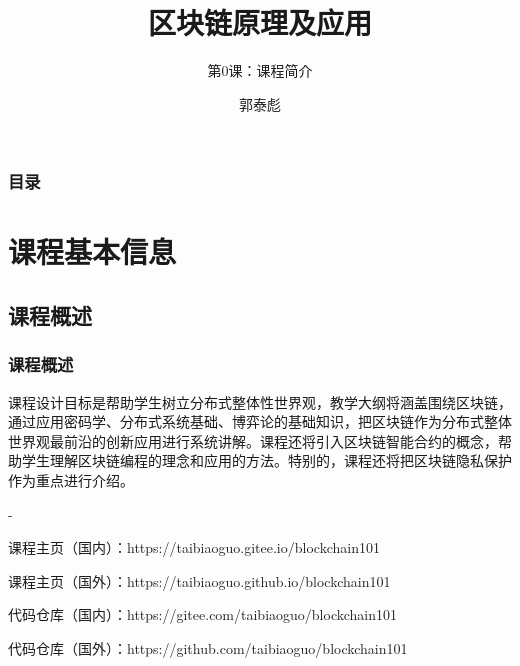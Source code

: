 \documentclass[11pt]{beamer}
\begin{document}
	\author{郭泰彪}
	\title{区块链原理及应用}
	\subtitle{第0课：课程简介}

	\begin{frame}[plain]
		\maketitle
	\end{frame}
	
	\begin{frame}
		\frametitle{目录}
		\tableofcontents[sectionstyle=show,subsectionstyle=show/shaded]
	\end{frame}

	\section{课程基本信息}
	\subsection{课程概述}
	\begin{frame}
		\frametitle{课程概述}
	课程设计目标是帮助学生树立分布式整体性世界观，教学大纲将涵盖围绕区块链，通过应用密码学、分布式系统基础、博弈论的基础知识，把区块链作为分布式整体世界观最前沿的创新应用进行系统讲解。课程还将引入区块链智能合约的概念，帮助学生理解区块链编程的理念和应用的方法。特别的，课程还将把区块链隐私保护作为重点进行介绍。
	
	-
	
	\footnotesize {
	课程主页（国内）：https://taibiaoguo.git{\color{red}ee}.io/blockchain101
	
	课程主页（国外）：https://taibiaoguo.git{\color{red}hub}.io/blockchain101
	
	代码仓库（国内）：https://git{\color{red}ee}.com/taibiaoguo/blockchain101
	
	代码仓库（国外）：https://git{\color{red}hub}.com/taibiaoguo/blockchain101
	}
	\end{frame}
\end{document}
